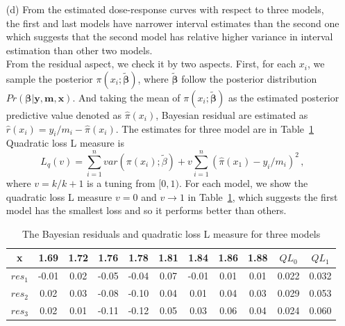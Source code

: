 \documentclass[]{article}
\begin{document}
\begin{enumerate}
{\begin{itemize}
\begin{figure}[ht!]
\begin{subfigure}{0.45\linewidth}
        			\caption{Point and $95\%$ interval estimates for $\pi(x)$}
        		\end{subfigure}
        		\caption{Summary of model with general link function}
        		\label{9}
        	\end{figure}
        	\item[(d)]
        	From the estimated dose-response curves with respect to three models, the first and last models have narrower interval estimates than the second one which suggests that the second model has relative higher variance in interval estimation than other two models.\\
        	From the residual aspect, we check it by two aspects. First, for each $x_i$, we sample the posterior $\pi(x_i; \tilde{\bm{\beta}})$, where $\tilde{\bm{\beta}}$ follow the posterior distribution $Pr(\bm{\beta}| \bm y, \bm m, \bm x)$. And taking the mean of $\pi(x_i; \tilde{\bm{\beta}})$ as the estimated posterior predictive value denoted as $\hat{\pi}(x_i)$, Bayesian residual are estimated as $\hat{r}(x_i) = y_i/m_i-\hat{\pi}(x_i)$. The estimates for three model are in Table~\ref{10} Quadratic loss L measure is 
        	\begin{equation}
        	L_q(v) = \sum_{i = 1}^{n}var(\pi(x_i); \tilde{\beta}) + v \sum_{i = 1}^{n}(\hat{\pi}(x_1) - y_i/m_i)^2\,,
        	\end{equation}
        	where  $v = k/k+1$ is a tuning from $[0,1)$. For each model, we show the quadratic loss L measure $v = 0$ and $v \rightarrow 1$ in Table~\ref{10}, which suggests the first model has the smallest loss and so it performs better than others.
        	\begin{table}
        		\centering
        		\caption{The Bayesian residuals and quadratic loss L measure for three models}
        		\begin{tabular}{c|c|c|c|c|c|c|c|c|c|c}
        			\hline
        			x & 1.69 & 1.72 & 1.76 & 1.78 & 1.81 & 1.84 & 1.86 & 1.88 & $QL_0$ & $QL_1$\\
        			\hline
        			$res_1$ & -0.01 & 0.02 &-0.05& -0.04 &  0.07 & -0.01 & 0.01 & 0.01 & 0.022 &  0.032\\
        			\hline 
        			$res_2$ &  0.02 & 0.03 & -0.08& -0.10 & 0.04 & 0.01 & 0.04 & 0.03 & 0.029 & 0.053\\
        			\hline
        			$res_3$ & 0.02 & 0.01 & -0.11 & -0.12 & 0.05 & 0.03 & 0.06 & 0.04 & 0.024 & 0.060 \\
        			\hline
        		\end{tabular}
        		\label{10}
        	\end{table}
        	
        \end{itemize}
	
}
\end{enumerate}
\end{document}
